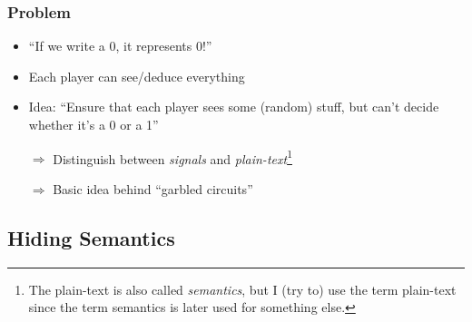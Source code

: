 \documentclass{beamer}
\begin{document}
\begin{frame}
  \frametitle{Problem}
  \begin{itemize}
  \item ``If we write a 0, it represents 0!''
  \item Each player can see/deduce everything
  \item Idea: ``Ensure that each player sees some (random) stuff, but can't decide whether it's a 0 or a 1''

    $\Rightarrow$ Distinguish between \emph{signals} and \emph{plain-text}\footnote{The plain-text is also called \emph{semantics}, but I (try to) use the term plain-text since the term semantics is later used for something else.}

    $\Rightarrow$ Basic idea behind ``garbled circuits''
  \end{itemize}
\end{frame}


\subsection{Hiding Semantics}
\end{document}
